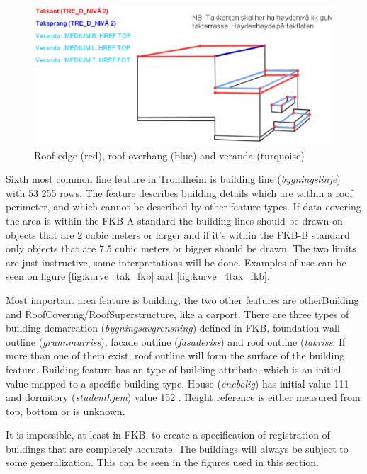 \begin{figure}[H]
    \centering
    \includegraphics[scale=0.4]{figures/veranda_fkb.png}
    \caption{Roof edge (red), roof overhang (blue) and veranda (turquoise) \cite{Kartverket2013a}}
    \label{fig:veranda}
\end{figure} 

Sixth most common line feature in Trondheim is building line (\textit{bygningslinje}) with 53 255 rows. The feature describes building details which are within a roof perimeter, and which cannot be described by other feature types. If data covering the area is within the FKB-A standard %
the building lines should be drawn on objects that are 2 cubic meters or larger and if it's within the FKB-B standard only objects that are 7.5 cubic meters or bigger should be drawn. The two limits are just instructive, some interpretations will be done. Examples of use can be seen on figure \ref{fig:kurve_tak_fkb} and \ref{fig:kurve_4tak_fkb}. 

Most important area feature is building, the two other features are otherBuilding and RoofCovering/RoofSuperstructure, like a carport. There are three types of building demarcation (\textit{bygningsavgrensning}) defined in FKB, foundation wall outline (\textit{grunnmurriss}), facade outline (\textit{fasaderiss}) and roof outline (\textit{takriss}. If more than one of them exist, roof outline will form the surface of the building feature. Building feature has an type of building attribute, which is an initial value mapped to a specific building type. House (\textit{enebolig}) has initial value 111 and dormitory (\textit{studenthjem}) value 152 \cite{Kartverketd}. Height reference is either measured from top, bottom or is unknown. 

It is impossible, at least in FKB, to create a specification of registration of buildings that are completely accurate. The buildings will always be subject to some generalization. This can be seen in the figures used in this section. 

